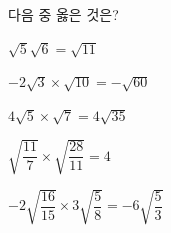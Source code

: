 다음 중 옳은 것은?
\begin{choicesii}{\rule[-3ex]{0pt}{8ex}$\sqrt{5}\sqrt{6}=\sqrt{11}$}{\rule[-3ex]{0pt}{8ex}$-2\sqrt{3}\times\sqrt{10}=-\sqrt{60}$}{\rule[-3ex]{0pt}{8ex}$4\sqrt{5}\times\sqrt{7}=4\sqrt{35}$}{\rule[-3ex]{0pt}{8ex}$\sqrt{\dfrac{11}{7}}\times\sqrt{\dfrac{28}{11}}=4$}{\rule[-3ex]{0pt}{8ex}$-2\sqrt{\dfrac{16}{15}}\times3\sqrt{\dfrac{5}{8}}=-6\sqrt{\dfrac{5}{3}}$}\end{choicesii}
